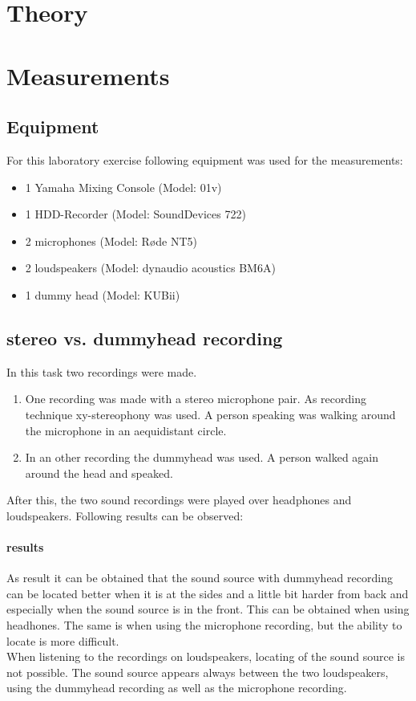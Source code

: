 \documentclass{article}
\begin{document}
\section{Theory}

\section{Measurements}
\subsection{Equipment}
For this laboratory exercise following equipment was used for the measurements:
\begin{itemize}
\item 1 Yamaha Mixing Console (Model: 01v)
\item 1 HDD-Recorder (Model: SoundDevices 722)
\item 2 microphones (Model: Røde NT5)
\item 2 loudspeakers (Model: dynaudio acoustics BM6A)
\item 1 dummy head (Model: KUBii)
\end{itemize}
\subsection{stereo vs. dummyhead recording}
In this task two recordings were made. 
\begin{enumerate}
\item One recording was made with a stereo microphone pair. As recording technique xy-stereophony was used. A person speaking was walking around the microphone in an aequidistant circle.
\item In an other recording the dummyhead was used. A person walked again around the head and speaked.
\end{enumerate}
After this, the two sound recordings were played over headphones and loudspeakers. Following results can be observed:
\paragraph{results\\}
As result it can be obtained that the sound source with dummyhead recording can be located better when it is at the sides and a little bit harder from back and especially when the sound source is in the front. This can be obtained when using headhones. The same is when using the microphone recording, but the ability to locate is more difficult.\\
When listening to the recordings on loudspeakers, locating of the sound source is not possible. The sound source appears always between the two loudspeakers, using the dummyhead recording as well as the microphone recording.
\end{document}
